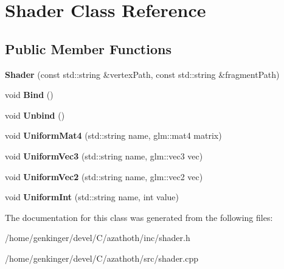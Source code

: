 \hypertarget{classShader}{}\section{Shader Class Reference}
\label{classShader}
\subsection*{Public Member Functions}
\begin{DoxyCompactItemize}
\item 
\mbox{\label{classShader_ad80a9756b7d9a62adea45fcd82a06f4c}} 
{\bfseries Shader} (const std\+::string \&vertex\+Path, const std\+::string \&fragment\+Path)
\item 
\mbox{\label{classShader_a8b5c8c4788d011a65d158ef8428d1ece}} 
void {\bfseries Bind} ()
\item 
\mbox{\label{classShader_aa53965ba78cf36b664e1f53d337b1b0b}} 
void {\bfseries Unbind} ()
\item 
\mbox{\label{classShader_a015be391017a8e440eef3e568b0bb685}} 
void {\bfseries Uniform\+Mat4} (std\+::string name, glm\+::mat4 matrix)
\item 
\mbox{\label{classShader_ada1bc24f3c1b7f1b418fddabcf359ba1}} 
void {\bfseries Uniform\+Vec3} (std\+::string name, glm\+::vec3 vec)
\item 
\mbox{\label{classShader_a222c5c1b6e023caa3239cf834f9c203b}} 
void {\bfseries Uniform\+Vec2} (std\+::string name, glm\+::vec2 vec)
\item 
\mbox{\label{classShader_a72400369e1b397ee49823ca15344c1d4}} 
void {\bfseries Uniform\+Int} (std\+::string name, int value)
\end{DoxyCompactItemize}


The documentation for this class was generated from the following files\+:\begin{DoxyCompactItemize}
\item 
/home/genkinger/devel/\+C/azathoth/inc/shader.\+h\item 
/home/genkinger/devel/\+C/azathoth/src/shader.\+cpp\end{DoxyCompactItemize}
